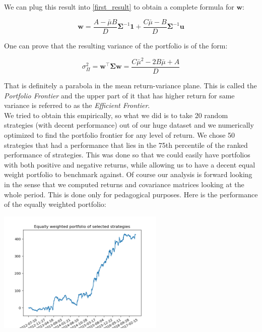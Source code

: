 We can plug this result into \eqref{first_result} to obtain a complete formula for $\mathbf{w}$:

\begin{equation} \label{final_result}
\mathbf{w} = \frac{A - \bar{\mu}B}{D}\mathbf{\Sigma}^{-1}\mathbf{1} + \frac{C\bar{\mu} - B}{D}\mathbf{\Sigma}^{-1}\mathbf{u}
\end{equation}

One can prove that the resulting variance of the portfolio is of the form:

\begin{equation} \label{N_portfolio_variance}
\sigma^2_{\Pi} = \mathbf{w}^\top \mathbf{\Sigma}\mathbf{w} = \frac{C\bar{\mu}^2 - 2B\bar{\mu} + A}{D}
\end{equation}

That is definitely a parabola in the mean return-variance plane. This is called the \textit{Portfolio Frontier} and the upper part of it that has higher return for same variance is referred to as the \textit{Efficient Frontier}.\\
We tried to obtain this empirically, so what we did is to take 20 random strategies (with decent performance) out of our huge dataset and we numerically optimized to find the portfolio frontier for any level of return. We chose 50 strategies that had a performance that lies in the 75th percentile of the ranked performance of strategies. This was done so that we could easily have portfolios with both positive and negative returns, while allowing us to have a decent equal weight portfolio to benchmark against. Of course our analysis is forward looking in the sense that we computed returns and covariance matrices looking at the whole period. This is done only for pedagogical purposes. Here is the performance of the equally weighted portfolio:

\begin{center}
	\centering
	\includegraphics[width=0.6\textwidth]{Portfolio_Theory/Portfolio_Front_Figure_1.png}
	\label{Equal_Weight_frontier}
\end{center}


